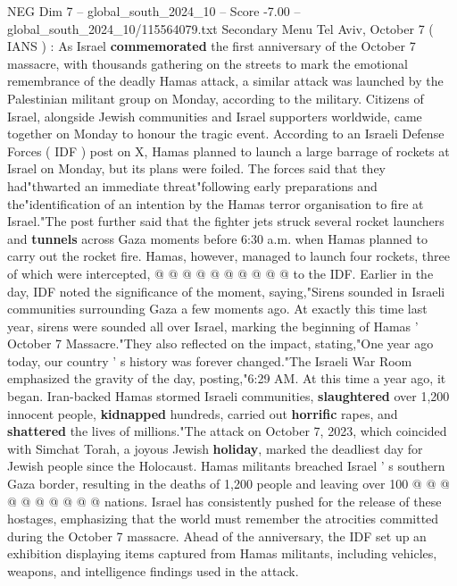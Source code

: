\begin{textsample}{NEG Dim 7 – global\_south\_2024\_10 – Score -7.00 – global\_south\_2024\_10/115564079.txt}  \label{ex:f7_neg_246}
Secondary Menu Tel Aviv, October 7 ( IANS ) : As Israel \textbf{commemorated} the first anniversary of the October 7 massacre, with thousands gathering on the streets to mark the emotional remembrance of the deadly Hamas attack, a similar attack was launched by the Palestinian militant group on Monday, according to the military.
Citizens of Israel, alongside Jewish communities and Israel supporters worldwide, came together on Monday to honour the tragic event.
According to an Israeli Defense Forces ( IDF ) post on X, Hamas planned to launch a large barrage of rockets at Israel on Monday, but its plans were foiled.
The forces said that they had"thwarted an immediate threat"following early preparations and the"identification of an intention by the Hamas terror organisation to fire at Israel."The post further said that the fighter jets struck several rocket launchers and \textbf{tunnels} across Gaza moments before 6:30 a.m. when Hamas planned to carry out the rocket fire.
Hamas, however, managed to launch four rockets, three of which were intercepted, @ @ @ @ @ @ @ @ @ @ to the IDF.
Earlier in the day, IDF noted the significance of the moment, saying,"Sirens sounded in Israeli communities surrounding Gaza a few moments ago.
At exactly this time last year, sirens were sounded all over Israel, marking the beginning of Hamas ' October 7 Massacre."They also reflected on the impact, stating,"One year ago today, our country ' s history was forever changed."The Israeli War Room emphasized the gravity of the day, posting,"6:29 AM.
At this time a year ago, it began.
Iran-backed Hamas stormed Israeli communities, \textbf{slaughtered} over 1,200 innocent people, \textbf{kidnapped} hundreds, carried out \textbf{horrific} rapes, and \textbf{shattered} the lives of millions."The attack on October 7, 2023, which coincided with Simchat Torah, a joyous Jewish \textbf{holiday}, marked the deadliest day for Jewish people since the Holocaust.
Hamas militants breached Israel ' s southern Gaza border, resulting in the deaths of 1,200 people and leaving over 100 @ @ @ @ @ @ @ @ @ @ nations.
Israel has consistently pushed for the release of these hostages, emphasizing that the world must remember the atrocities committed during the October 7 massacre.
Ahead of the anniversary, the IDF set up an exhibition displaying items captured from Hamas militants, including vehicles, weapons, and intelligence findings used in the attack.

\end{textsample}
